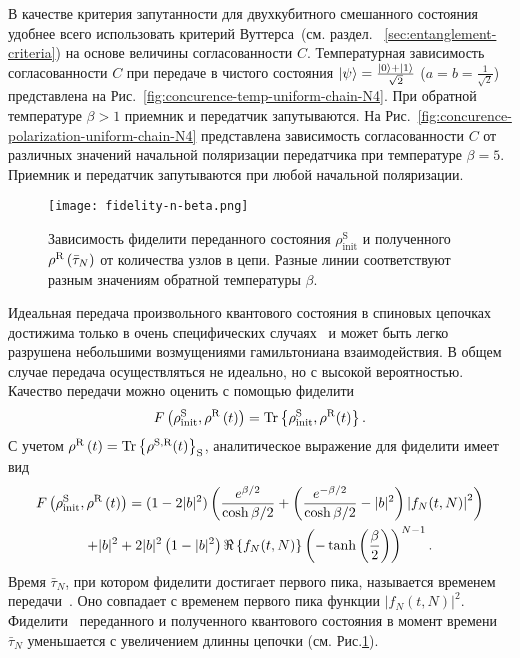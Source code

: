 В качестве критерия запутанности для двухкубитного смешанного состояния удобнее всего использовать критерий Вуттерса~(см. раздел. ~\ref{sec:entanglement-criteria}) на основе величины согласованности $C$.
Температурная зависимость согласованности $C$ при передаче в чистого состояния $\left| \psi \right\rangle = \frac{\left| 0 \right\rangle + \left| 1 \right\rangle}{\sqrt{2}}$ ($a=b=\frac{1}{\sqrt{2}}$) представлена на Рис.~\ref{fig:concurence-temp-uniform-chain-N4}.
При обратной температуре $\beta > 1$ приемник и передатчик запутываются.
На Рис.~\ref{fig:concurence-polarization-uniform-chain-N4} представлена зависимость согласованности $C$ от различных значений начальной поляризации передатчика при температуре $\beta = 5$.
Приемник и передатчик запутываются при любой начальной поляризации.

\begin{figure}[H]
    \centering
    \texttt{[image: fidelity-n-beta.png]}
    \caption{
      Зависимость фиделити переданного состояния
      $\rho^\mathrm{S}_\mathrm{init}$
      и полученного
      $\rho^\mathrm{R}\left( \bar\tau_N \right)$
      от количества узлов в цепи.
      Разные линии соответствуют разным значениям обратной температуры $\beta$.
     }
    \label{fig:fidelity-n-beta}
\end{figure}

Идеальная передача произвольного квантового состояния в спиновых цепочках достижима только в очень специфических случаях~\cite{Christandl2004, Karbach2005} и может быть легко разрушена небольшими возмущениями гамильтониана взаимодействия.
В общем случае передача осуществляться не идеально,
но с высокой вероятностью.
Качество передачи можно оценить с помощью фиделити~\cite{Jozsa1994}
%
\begin{equation}\label{generalFidelity}
  F\left( \rho^\mathrm{S}_\mathrm{init}, \rho^\mathrm{R}\left( t \right) \right)
  = \mathrm{Tr} \left\{ \rho^\mathrm{S}_\mathrm{init}, \rho^\mathrm{R}(t) \right\}.
\end{equation}
%
С учетом $\rho^\mathrm{R}\left( t \right) = \mathrm{Tr} \left\{ \rho^\mathrm{S,R}(t) \right\}_\mathrm{S}$,
аналитическое выражение для фиделити имеет вид
%
\begin{multline}\label{exactfidelity}
  F\left( \rho^\mathrm{S}_\mathrm{init}, \rho^\mathrm{R}\left( t \right) \right)
  = (1-2|b|^2)\left( 
    \frac{e^{\beta/2}}{\cosh \beta/2}
    + \left( \frac{e^{-\beta/2}}{\cosh \beta/2} -|b|^2  \right)
      \left|f_N(t, N)\right|^2
   \right) \\
  + |b|^2
  + 2 |b|^2 \left( 1-|b|^2 \right) \Re\left\{f_N(t, N)\right\}
  \left( -\tanh \left( \frac{\beta}{2} \right) \right)^{N-1}.
\end{multline}
%
Время $\bar\tau_{N}$, при котором фиделити достигает первого пика, называется временем передачи~\cite{Feldman2016}.
Оно совпадает с временем первого пика функции $\left|f_N(t, N)\right|^2$.
Фиделити~\cite{Jozsa1994} переданного и полученного квантового состояния в момент времени $\bar\tau_{N}$ уменьшается с увеличением длинны цепочки (см. Рис.\ref{fig:fidelity-n-beta}).


